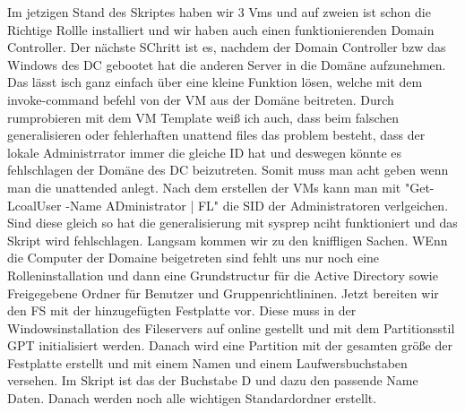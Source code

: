 \documentclass[conference]{IEEEtran}
\begin{document}
Im jetzigen Stand des Skriptes haben wir 3 Vms und auf zweien ist schon die Richtige Rollle installiert und wir haben auch einen funktionierenden Domain Controller. Der nächste SChritt ist es, nachdem der Domain Controller bzw das Windows des DC gebootet hat die anderen Server in die Domäne aufzunehmen. Das lässt isch ganz einfach über eine kleine Funktion lösen, welche mit dem invoke-command befehl von der VM aus der Domäne beitreten. Durch rumprobieren mit dem VM Template weiß ich auch, dass beim falschen generalisieren oder fehlerhaften unattend files das problem besteht, dass der lokale Administrrator immer die gleiche ID hat und deswegen könnte es fehlschlagen der Domäne des DC beizutreten. Somit muss man acht geben wenn man die unattended anlegt. Nach dem erstellen der VMs kann man mit "Get-LcoalUser -Name ADministrator | FL" die SID der Administratoren verlgeichen. Sind diese gleich so hat die generalisierung mit sysprep nciht funktioniert und das Skript wird fehlschlagen. Langsam kommen wir zu den kniffligen Sachen. WEnn die Computer der Domaine beigetreten sind fehlt uns nur noch eine Rolleninstallation und dann eine Grundstructur für die Active Directory sowie Freigegebene Ordner für Benutzer und Gruppenrichtlininen. 
Jetzt bereiten wir den FS mit der hinzugefügten Festplatte vor. Diese muss in der Windowsinstallation des Fileservers auf online gestellt und mit dem Partitionsstil GPT initialisiert werden. Danach wird eine Partition mit der gesamten größe der Festplatte erstellt und mit einem Namen und einem Laufwersbuchstaben versehen. Im Skript ist das der Buchstabe D und dazu den passende Name Daten. Danach werden noch alle wichtigen Standardordner erstellt.



\end{document}

